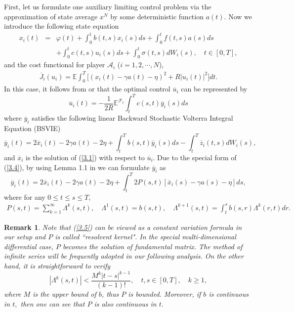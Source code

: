 \documentclass[11pt]{article}
\newtheorem{remark}{Remark}[section]
\def\dbE{\mathbb{E}}
\begin{document}
First, let us formulate one auxiliary limiting control problem via
the approximation of state average $x^{N}$ by some deterministic
function $a(t)$. Now we introduce the following state
equation
%
\begin{eqnarray}\label{3.1}
x_{i}(t)&=&\varphi
(t)+\int_{0}^{t}b(t,s)x_{i}(s)ds+\int_{0}^{t}f(t,s)a(s)ds\nonumber
\\
&&+\int_{0}^{t}c(t,s)u_{i}(s)ds+%
\int_{0}^{t}\sigma(t,s)dW_{i}(s),\quad t\in[0,T],
\end{eqnarray}
%
and the cost functional for player $\mathcal{A}_i$
($i=1,2,\cdots,N$),
%
\begin{eqnarray}\label{3.2}
\overline{J}_{i}(u_{i})=\dbE\int_{0}^{T}\Big[(x_{i}(t)-\gamma a(t)-\eta )^{2}+R|u_{i}(t)|^{2}\Big] dt.
\end{eqnarray}
%
In this case, it follows from \cite{S-W-Y 2013} or \cite{Y 2008} that the optimal control $\overline{u}_{i}$ can be
represented by
%
\begin{equation}\label{3.3}
\overline{u}_{i}(t)=-\frac{1}{2R}\dbE^{\mathcal{F}_{t}}\!\!\int_{t}^{T}c(s,t)
\overline{y}_{i}(s)ds
\end{equation}%
%
where $\overline{y}_i$ satisfies the following linear Backward Stochastic Volterra Integral Equation (BSVIE)
%
\begin{equation}\label{3.4}
\overline{y}_{i}(t)=2\overline{x}_{i}(t)-2\gamma a(t)-2\eta
+\int_{t}^{T}b(s,t)\overline{y}_{i}(s)ds-\int_{t}^{T}\overline{z}%
_{i}(t,s)dW_{i}(s),
\end{equation}%
%
and $\overline{x}_{i}$ is the solution of (\ref{3.1}) with respect
to $\overline{u}_i$.
Due to the special form of (\ref{3.4}), by using Lemma 1.1 in \cite{Y 1996} we can formulate $\overline{y}_{i}$ as%
%
\begin{equation}\label{3.5}
\overline{y}_{i}(t)=2\overline{x}_{i}(t)-2\gamma a(t)-2\eta
+\int_{t}^{T}2P(s,t)[\overline{x}_{i}(s)-\gamma a(s)-\eta ]ds,
\end{equation}%
%
where for any $0\leq t\leq s\leq T,$
%
\begin{eqnarray}\label{3.5.1}
P(s,t) =\sum\limits_{k=1}^{\infty }\Lambda^{k}(s,t), \quad
\Lambda^{1}(s,t) =b(s,t), \quad
\Lambda^{k+1}(s,t)=\int_{t}^{s}b(s,r)\Lambda^{k}(r,t)dr.
\end{eqnarray}%
%
\begin{remark}\label{remark3.1}
Note that (\ref{3.5}) can be viewed as a constant variation formula
in our setup and $P$ is called ``resolvent kernel". In
the special multi-dimensional differential case, $P$ becomes the
solution of fundamental matrix. The method of infinite series will be
frequently adopted in our following analysis. On the other hand, it is straightforward to
verify%
\[
|\Lambda^{k}(s,t)|<\frac{M^{k}|t-s|^{k-1}}{(k-1)!},\quad
t,s\in[0,T],\quad k\geq 1,
\]%
%
where $M$ is the upper bound of $b$, thus $P$ is bounded. Moreover,
if $b$ is continuous in $t,$ then one can see that $P$ is also
continuous in $t.$
\end{remark}
\end{document}
